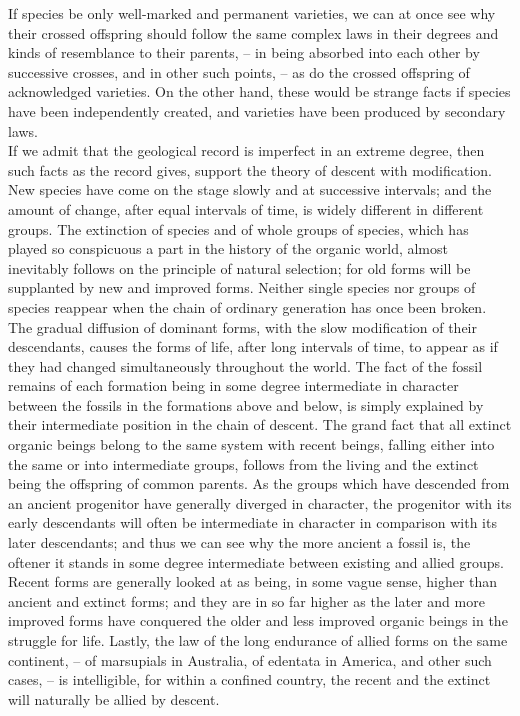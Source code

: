 \indent If species be only well-marked and permanent varieties, we can at once see why their crossed offspring should follow the same complex laws in their degrees and kinds of resemblance to their parents, -- in being absorbed into each other by successive crosses, and in other such points, -- as do the crossed offspring of acknowledged varieties. On the other hand, these would be strange facts if species have been independently created, and varieties have been produced by secondary laws.~\\
\indent If we admit that the geological record is imperfect in an extreme degree, then such facts as the record gives, support the theory of descent with modification. New species have come on the stage slowly and at successive intervals; and the amount of change, after equal intervals of time, is widely different in different groups. The extinction of species and of whole groups of species, which has played so conspicuous a part in the history of the organic world, almost inevitably follows on the principle of natural selection; for old forms will be supplanted by new and improved forms. Neither single species nor groups of species reappear when the chain of ordinary generation has once been broken. The gradual diffusion of dominant forms, with the slow modification of their descendants, causes the forms of life, after long intervals of time, to appear as if they had changed simultaneously throughout the world. The fact of the fossil remains of each formation being in some degree intermediate in character between the fossils in the formations above and below, is simply explained by their intermediate position in the chain of descent. The grand fact that all extinct organic beings belong to the same system with recent beings, falling either into the same or into intermediate groups, follows from the living and the extinct being the offspring of common parents. As the groups which have descended from an ancient progenitor have generally diverged in character, the progenitor with its early descendants will often be intermediate in character in comparison with its later descendants; and thus we can see why the more ancient a fossil is, the oftener it stands in some degree intermediate between existing and allied groups.  Recent forms are generally looked at as being, in some vague sense, higher than ancient and extinct forms; and they are in so far higher as the later and more improved forms have conquered the older and less improved organic beings in the struggle for life. Lastly, the law of the long endurance of allied forms on the same continent, -- of marsupials in Australia, of edentata in America, and other such cases, -- is intelligible, for within a confined country, the recent and the extinct will naturally be allied by descent.~\\
